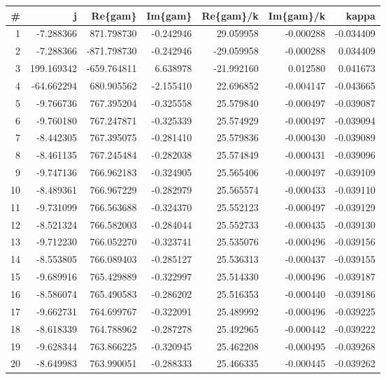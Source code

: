 \begin{tabular}{rrrrrrr}
\toprule
   \# &          j &     Re\{gam\} &   Im\{gam\} &  Re\{gam\}/k &  Im\{gam\}/k &     kappa \\
\midrule
   1 &  -7.288366 &  871.798730 & -0.242946 &  29.059958 &  -0.000288 & -0.034409 \\
   2 &  -7.288366 & -871.798730 & -0.242946 & -29.059958 &  -0.000288 &  0.034409 \\
   3 & 199.169342 & -659.764811 &  6.638978 & -21.992160 &   0.012580 &  0.041673 \\
   4 & -64.662294 &  680.905562 & -2.155410 &  22.696852 &  -0.004147 & -0.043665 \\
   5 &  -9.766736 &  767.395204 & -0.325558 &  25.579840 &  -0.000497 & -0.039087 \\
   6 &  -9.760180 &  767.247871 & -0.325339 &  25.574929 &  -0.000497 & -0.039094 \\
   7 &  -8.442305 &  767.395075 & -0.281410 &  25.579836 &  -0.000430 & -0.039089 \\
   8 &  -8.461135 &  767.245484 & -0.282038 &  25.574849 &  -0.000431 & -0.039096 \\
   9 &  -9.747136 &  766.962183 & -0.324905 &  25.565406 &  -0.000497 & -0.039109 \\
  10 &  -8.489361 &  766.967229 & -0.282979 &  25.565574 &  -0.000433 & -0.039110 \\
  11 &  -9.731099 &  766.563688 & -0.324370 &  25.552123 &  -0.000497 & -0.039129 \\
  12 &  -8.521324 &  766.582003 & -0.284044 &  25.552733 &  -0.000435 & -0.039130 \\
  13 &  -9.712230 &  766.052270 & -0.323741 &  25.535076 &  -0.000496 & -0.039156 \\
  14 &  -8.553805 &  766.089403 & -0.285127 &  25.536313 &  -0.000437 & -0.039155 \\
  15 &  -9.689916 &  765.429889 & -0.322997 &  25.514330 &  -0.000496 & -0.039187 \\
  16 &  -8.586074 &  765.490583 & -0.286202 &  25.516353 &  -0.000440 & -0.039186 \\
  17 &  -9.662731 &  764.699767 & -0.322091 &  25.489992 &  -0.000496 & -0.039225 \\
  18 &  -8.618339 &  764.788962 & -0.287278 &  25.492965 &  -0.000442 & -0.039222 \\
  19 &  -9.628344 &  763.866225 & -0.320945 &  25.462208 &  -0.000495 & -0.039268 \\
  20 &  -8.649983 &  763.990051 & -0.288333 &  25.466335 &  -0.000445 & -0.039262 \\

\end{tabular}
